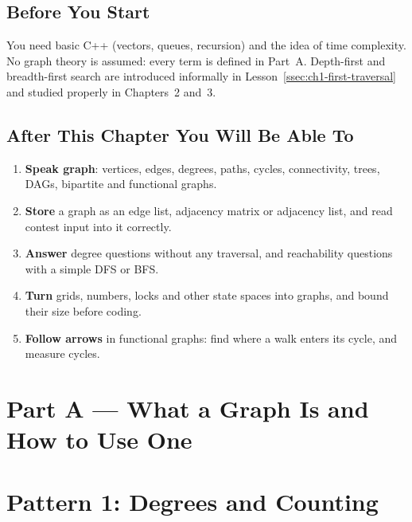 \subsection*{Before You Start}

You need basic C++ (vectors, queues, recursion) and the idea of time complexity. No graph theory is assumed: every term is defined in Part~A. Depth-first and breadth-first search are introduced informally in Lesson~\ref{ssec:ch1-first-traversal} and studied properly in Chapters~2 and~3.

\subsection*{After This Chapter You Will Be Able To}
\begin{enumerate}[leftmargin=*]
    \item \textbf{Speak graph}: vertices, edges, degrees, paths, cycles, connectivity, trees, DAGs, bipartite and functional graphs.
    \item \textbf{Store} a graph as an edge list, adjacency matrix or adjacency list, and read contest input into it correctly.
    \item \textbf{Answer} degree questions without any traversal, and reachability questions with a simple DFS or BFS.
    \item \textbf{Turn} grids, numbers, locks and other state spaces into graphs, and bound their size before coding.
    \item \textbf{Follow arrows} in functional graphs: find where a walk enters its cycle, and measure cycles.
\end{enumerate}

\chaptercontents

\section{Part A --- What a Graph Is and How to Use One}
\label{sec:ch1-lessons}






\clearpage
\section{Pattern 1: Degrees and Counting}
\label{sec:ch1-p1}





